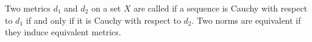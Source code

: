 Two metrics $d_1$ and $d_2$ on a set $X$ are called  if a sequence is Cauchy with respect to $d_1$ if and only if it is Cauchy with respect to $d_2$. Two norms are equivalent if they induce equivalent metrics.